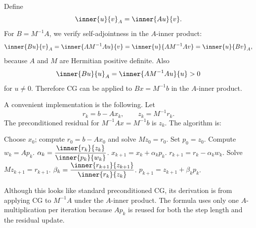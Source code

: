 \documentclass{ctexart}
\begin{document}
\begin{solution}
  Define
  \[
    \inner{u}{v}_A=\inner{Au}{v}.
  \]
  For $B=M^{-1}A$, we verify self-adjointness in the $A$-inner product:
  \[
    \inner{Bu}{v}_A
    =\inner{A M^{-1}Au}{v}
    =\inner{u}{A M^{-1}A v}
    =\inner{u}{Bv}_A,
  \]
  because $A$ and $M$ are Hermitian positive definite.  Also
  \[
    \inner{Bu}{u}_A=\inner{A M^{-1}Au}{u}>0
  \]
  for $u\ne0$.  Therefore CG can be applied to $Bx=M^{-1}b$ in the $A$-inner product.

  A convenient implementation is the following.  Let
  \[
    r_k=b-Ax_k,
    \qquad
    z_k=M^{-1}r_k.
  \]
  The preconditioned residual for $M^{-1}Ax=M^{-1}b$ is $z_k$.  The algorithm is:

  \begin{algorithm}[H]
    \caption{$A$-inner-product left-preconditioned CG}
    \begin{algorithmic}[1]
      \State Choose $x_0$; compute $r_0=b-Ax_0$ and solve $Mz_0=r_0$.
      \State Set $p_0=z_0$.
      \State Compute $w_k=Ap_k$. 
      \State $\displaystyle \alpha_k=\frac{\inner{r_k}{z_k}}{\inner{p_k}{w_k}}$.
      \State $x_{k+1}=x_k+\alpha_kp_k$.
      \State $r_{k+1}=r_k-\alpha_kw_k$.
      \State Solve $Mz_{k+1}=r_{k+1}$.
      \State $\displaystyle \beta_k=\frac{\inner{r_{k+1}}{z_{k+1}}}{\inner{r_k}{z_k}}$.
      \State $p_{k+1}=z_{k+1}+\beta_kp_k$.
      \EndFor
    \end{algorithmic}
  \end{algorithm}

  Although this looks like standard preconditioned CG, its derivation is from applying CG to $M^{-1}A$ under the $A$-inner product.  The formula uses only one $A$-multiplication per iteration because $Ap_k$ is reused for both the step length and the residual update.
\end{solution}
\end{document}
